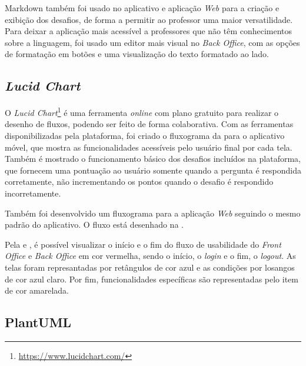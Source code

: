 Markdown também foi usado no aplicativo e aplicação \textit{Web} para a criação e exibição dos desafios, de forma a permitir ao professor uma maior versatilidade. Para deixar a aplicação mais acessível a professores que não têm conhecimentos sobre a linguagem, foi usado um editor mais visual no \textit{Back Office}, com as opções de formatação em botões e uma visualização do texto formatado ao lado.

\subsection{\textit{Lucid Chart}}
\label{lucidChart}

O \textit{Lucid Chart}\footnote{\url{https://www.lucidchart.com/}} é uma ferramenta \textit{online} com plano gratuito para realizar o desenho de fluxos, podendo ser feito de forma colaborativa. Com as ferramentas disponibilizadas pela plataforma, foi criado o fluxograma da  para o aplicativo móvel, que mostra as funcionalidades acessíveis pelo usuário final por cada tela. Também é mostrado o funcionamento básico dos desafios incluídos na plataforma, que fornecem uma pontuação ao usuário somente quando a pergunta é respondida corretamente, não incrementando os pontos quando o desafio é respondido incorretamente.


Também foi desenvolvido um fluxograma para a aplicação \textit{Web} seguindo o mesmo padrão do aplicativo. O fluxo está desenhado na .


Pela  e , é possível visualizar o início e o fim do fluxo de usabilidade do \textit{Front Office} e \textit{Back Office} em cor vermelha, sendo o início, o \textit{login} e o fim, o \textit{logout}. As telas foram represantadas por retângulos de cor azul e as condições por losangos de cor azul claro. Por fim, funcionalidades específicas são representadas pelo item de cor amarelada.

\subsection{PlantUML}
\label{plantuml}

